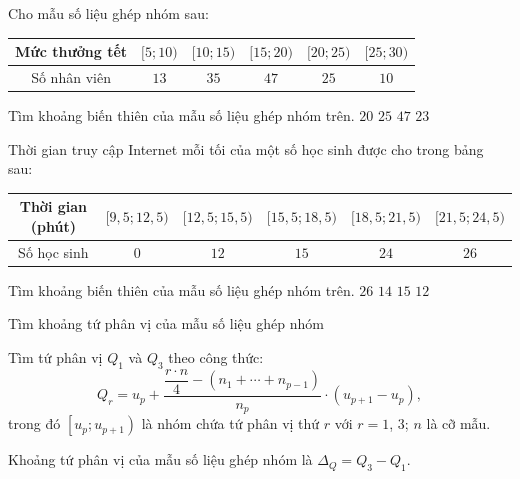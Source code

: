 \begin{ex}
	Cho mẫu số liệu ghép nhóm sau:
	\vspace*{-10pt}
	\begin{center}
		\begin{tabular}{|c|c|c|c|c|c|}
			\hline Mức thưởng tết & {$[5 ; 10)$} & {$[10 ; 15)$} & {$[15 ; 20)$} & {$[20 ; 25)$} &  {$[25 ;30)$} \\
			\hline Số nhân viên & $13$ & $35$ & $47$ & $25$ & $10$  \\
			\hline
		\end{tabular}
	\end{center}
	Tìm khoảng biến thiên của mẫu số liệu ghép nhóm trên.
	\choice
	{$20$}
	{\True $25$}
	{$47$}
	{$23$}
\end{ex}
\begin{ex}
	Thời gian truy cập Internet mỗi tối của một số học sinh được cho trong bảng sau:
	\begin{center}
		\begin{tabular}{|c|c|c|c|c|c|}
			\hline Thời gian (phút) & {$[9{,}5 ; 12{,}5)$} & {$[12{,}5 ; 15{,}5)$} & {$[15{,}5 ; 18{,}5)$} & {$[18{,}5 ; 21{,}5)$} & {$[21{,}5 ; 24{,}5)$} \\
			\hline Số học sinh & $0$ & $12$ & $15$ & $24$ & $26$ \\
			\hline
		\end{tabular}
	\end{center}
	Tìm khoảng biến thiên của mẫu số liệu ghép nhóm trên.
	\choice
	{$26$}
	{$14$}
	{$15$}
	{\True $12$}
\end{ex}
\begin{dang}{Tìm khoảng tứ phân vị của mẫu số liệu ghép nhóm}
	\begin{listEX}[1]
		\item [\ding{172}] Tìm tứ phân vị $ Q_1$ và $Q_3 $ theo công thức:
		$$Q_r=u_p+\dfrac{\dfrac{r \cdot n}{4}-\left(n_1+\cdots+n_{p-1}\right)}{n_p} \cdot\left(u_{p+1}-u_p\right), $$
		trong đó $\left[u_p; u_{p+1}\right)$ là nhóm chứa tứ phân vị thứ $r$ với $r=1$, $3$; \quad $n$ là cỡ mẫu.
		\item [\ding{173}] Khoảng tứ phân vị của mẫu số liệu ghép nhóm là $\Delta_Q=Q_3-Q_1$.
	\end{listEX}
\end{dang}
